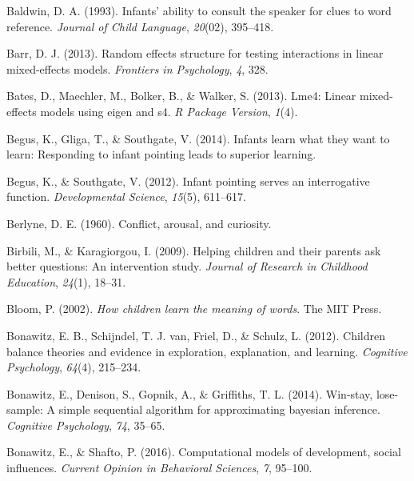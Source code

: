 \documentclass[oneside]{report}
\begin{document}
\leavevmode\hypertarget{ref-baldwin1993infants}{}%
Baldwin, D. A. (1993). Infants' ability to consult the speaker for clues
to word reference. \emph{Journal of Child Language}, \emph{20}(02),
395--418.

\leavevmode\hypertarget{ref-barr2013random}{}%
Barr, D. J. (2013). Random effects structure for testing interactions in
linear mixed-effects models. \emph{Frontiers in Psychology}, \emph{4},
328.

\leavevmode\hypertarget{ref-bates2013lme4}{}%
Bates, D., Maechler, M., Bolker, B., \& Walker, S. (2013). Lme4: Linear
mixed-effects models using eigen and s4. \emph{R Package Version},
\emph{1}(4).

\leavevmode\hypertarget{ref-begus2014infants}{}%
Begus, K., Gliga, T., \& Southgate, V. (2014). Infants learn what they
want to learn: Responding to infant pointing leads to superior learning.

\leavevmode\hypertarget{ref-begus2012infant}{}%
Begus, K., \& Southgate, V. (2012). Infant pointing serves an
interrogative function. \emph{Developmental Science}, \emph{15}(5),
611--617.

\leavevmode\hypertarget{ref-berlyne1960conflict}{}%
Berlyne, D. E. (1960). Conflict, arousal, and curiosity.

\leavevmode\hypertarget{ref-birbili2009helping}{}%
Birbili, M., \& Karagiorgou, I. (2009). Helping children and their
parents ask better questions: An intervention study. \emph{Journal of
Research in Childhood Education}, \emph{24}(1), 18--31.

\leavevmode\hypertarget{ref-bloom2002children}{}%
Bloom, P. (2002). \emph{How children learn the meaning of words}. The
MIT Press.

\leavevmode\hypertarget{ref-bonawitz2012children}{}%
Bonawitz, E. B., Schijndel, T. J. van, Friel, D., \& Schulz, L. (2012).
Children balance theories and evidence in exploration, explanation, and
learning. \emph{Cognitive Psychology}, \emph{64}(4), 215--234.

\leavevmode\hypertarget{ref-bonawitz2014win}{}%
Bonawitz, E., Denison, S., Gopnik, A., \& Griffiths, T. L. (2014).
Win-stay, lose-sample: A simple sequential algorithm for approximating
bayesian inference. \emph{Cognitive Psychology}, \emph{74}, 35--65.

\leavevmode\hypertarget{ref-bonawitz2016computational}{}%
Bonawitz, E., \& Shafto, P. (2016). Computational models of development,
social influences. \emph{Current Opinion in Behavioral Sciences},
\emph{7}, 95--100.
\end{document}
